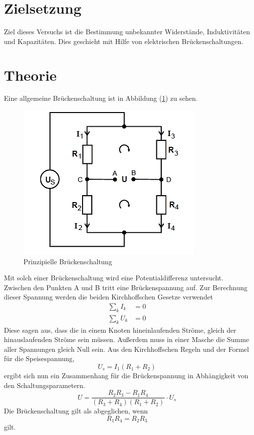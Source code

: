 
\setcounter{page}{1}
\section{Zielsetzung}
Ziel dieses Versuchs ist die Bestimmung unbekannter Widerstände,
Induktivitäten und Kapazitäten.
Dies geschieht mit Hilfe von elektrischen Brückenschaltungen.
\section{Theorie}
Eine allgemeine Brückenschaltung ist in Abbildung (\ref{fig:br}) zu sehen.

\begin{figure}
  \centering
  \includegraphics[scale = 0.7]{Bruecke1.PNG}
  \caption{Prinzipielle Brückenschaltung\protect\cite{on3}}
  \label{fig:br}
\end{figure}
Mit solch einer Brückenschaltung wird eine Potentialdifferenz untersucht.
Zwischen den Punkten A und B tritt eine Brückenspannung auf.
Zur Berechnung dieser Spannung werden die beiden Kirchhoffschen Gesetze verwendet
\begin{align}
  \sum_k I_k &= 0 \\
  \sum_k U_k &= 0
\end{align}
Diese sagen aus, dass die in einem Knoten hineinlaufenden Ströme, gleich der hinauslaufenden Ströme sein müssen.
Außerdem muss in einer Masche die Summe aller Spannungen gleich Null sein.
Aus den Kirchhoffschen Regeln und der Formel für die Speisespannung,
\begin{equation}
  U_s = I_1(R_1 + R_2)
\end{equation}
ergibt sich nun ein Zusammenhang für die Brückenspannung in Abhängigkeit von den Schaltungsparametern.
\begin{equation}
  U = \frac{R_2R_3 - R_1R_4}{(R_3+R_4)(R_1+R_2)}\cdot U_s
\end{equation}
Die Brückenschaltung gilt als abgeglichen, wenn
\begin{equation}
R_1R_4=R_2R_3
\label{eqn:1}
\end{equation}
gilt.

